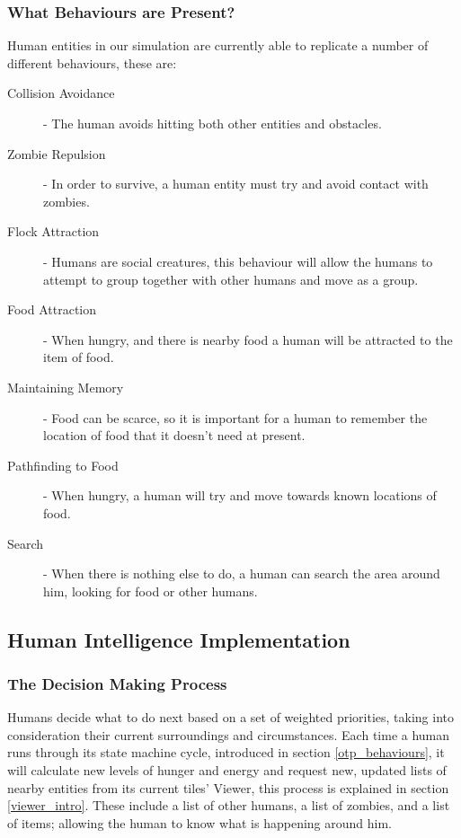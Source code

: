 \subsubsection{What Behaviours are Present?}
Human entities in our simulation are currently able to replicate a number of different behaviours, these are:
\begin{description}
  \item[Collision Avoidance] - The human avoids hitting both other entities and obstacles.
  \item[Zombie Repulsion] - In order to survive, a human entity must try and avoid contact with zombies.
  \item[Flock Attraction] - Humans are social creatures, this behaviour will allow the humans to attempt to group together with other humans and move as a group.
  \item[Food Attraction] - When hungry, and there is nearby food a human will be attracted to the item of food.
  \item[Maintaining Memory] - Food can be scarce, so it is important for a human to remember the location of food that it doesn't need at present.
  \item[Pathfinding to Food] - When hungry, a human will try and move towards known locations of food.
  \item[Search] - When there is nothing else to do, a human can search the area around him, looking for food or other humans.
\end{description}

\subsection{Human Intelligence Implementation}
\subsubsection{The Decision Making Process}
Humans decide what to do next based on a set of weighted priorities, taking into consideration their current surroundings and circumstances. Each time a human runs through its state machine cycle, introduced in section \ref{otp_behaviours}, it will calculate new levels of hunger and energy and request new, updated lists of nearby entities from its current tiles' Viewer, this process is explained in section \ref{viewer_intro}. These include a list of other humans, a list of zombies, and a list of items; allowing the human to know what is happening around him.

